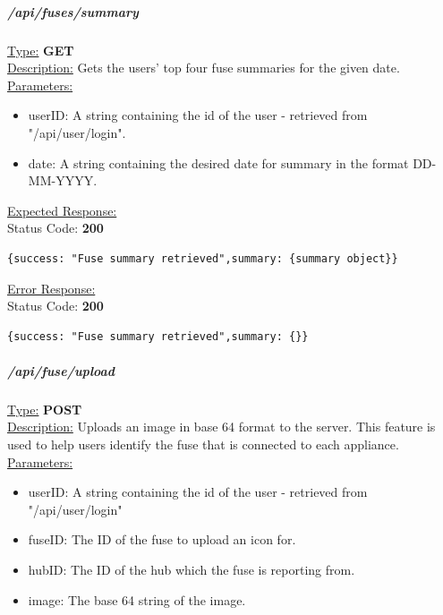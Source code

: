 \documentclass[preprint,12pt,3p]{elsarticle}
\newcommand{\forceindent}{\leavevmode{\parindent=1em\indent}}
\begin{document}
\subparagraph*{/api/fuses/summary}
\underline{Type:} \textbf{GET}\\

\underline{Description:} Gets the users' top four fuse summaries for the given date.\\

\underline{Parameters:}
\begin{itemize}
\item userID: A string containing the id of the user - retrieved from "/api/user/login".

\item date: A string containing the desired date for summary in the format DD-MM-YYYY.

\end{itemize}
\underline{Expected Response:}\\[5pt]
\forceindent Status Code: \textbf{200} \\
\begin{verbatim}
{success: "Fuse summary retrieved",summary: {summary object}}
\end{verbatim}
\underline{Error Response:}\\[5pt]
\forceindent Status Code: \textbf{200} \\
\begin{verbatim}
{success: "Fuse summary retrieved",summary: {}}
\end{verbatim}

\subparagraph*{/api/fuse/upload}
\underline{Type:} \textbf{POST}\\

\underline{Description:} Uploads an image in base 64 format to the server. This feature is used to help users identify the fuse that is connected to each appliance.\\

\underline{Parameters:}
\begin{itemize}
\item userID: A string containing the id of the user - retrieved from "/api/user/login"

\item fuseID: The ID of the fuse to upload an icon for.

\item hubID: The ID of the hub which the fuse is reporting from.

\item image: The base 64 string of the image.
\end{itemize}
\end{document}

